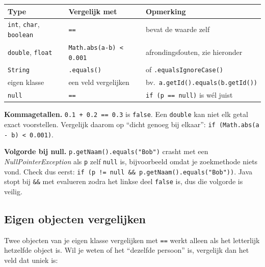 \documentclass[a4paper,11pt]{article}
\begin{document}
\begin{center}
    \begin{tabular}{@{}llp{6.4cm}@{}}
        \toprule
        \textbf{Type}                                 & \textbf{Vergelijk met}         & \textbf{Opmerking}                        \\
        \midrule
        \texttt{int}, \texttt{char}, \texttt{boolean} & \texttt{==}                    & bevat de waarde zelf                      \\
        \texttt{double}, \texttt{float}               & \texttt{Math.abs(a-b) < 0.001} & afrondingsfouten, zie hieronder           \\
        \texttt{String}                               & \texttt{.equals()}             & of \texttt{.equalsIgnoreCase()}           \\
        eigen klasse                                  & een veld vergelijken           & bv.\ \texttt{a.getId().equals(b.getId())} \\
        \texttt{null}                                 & \texttt{==}                    & \texttt{if (p == null)} is w\'el juist    \\
        \bottomrule
    \end{tabular}
\end{center}

\begin{warningbox}
    \textbf{Kommagetallen.} \texttt{0.1 + 0.2 == 0.3} is \texttt{false}. Een
    \texttt{double} kan niet elk getal exact voorstellen. Vergelijk daarom op
    ``dicht genoeg bij elkaar'': \texttt{if (Math.abs(a - b) < 0.001)}.

    \medskip
    \textbf{Volgorde bij null.} \texttt{p.getNaam().equals("Bob")} crasht met een
    \textit{NullPointerException} als \texttt{p} zelf \texttt{null} is, bijvoorbeeld
    omdat je zoekmethode niets vond. Check dus eerst:
    \texttt{if (p != null \&\& p.getNaam().equals("Bob"))}. Java stopt bij
    \texttt{\&\&} met evalueren zodra het linkse deel \texttt{false} is, dus die
    volgorde is veilig.
\end{warningbox}

\subsection{Eigen objecten vergelijken}

Twee objecten van je eigen klasse vergelijken met \texttt{==} werkt alleen als
het letterlijk hetzelfde object is. Wil je weten of het ``dezelfde persoon'' is,
vergelijk dan het veld dat uniek is:
\end{document}
